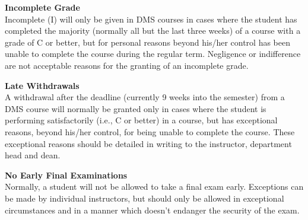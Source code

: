 \documentclass[12pt]{article}
\renewcommand{\emph}[1]{\textsf{\textbf{#1}}}
\newcommand{\localhead}[1]{\par\smallskip\textbf{#1}\nobreak\\}%
\def\subheading#1{\localhead{\emph{#1}}}
\begin{document}



\subheading{Incomplete Grade} 
Incomplete (I) will only be given in
  DMS courses in cases where
  the student has completed the majority (normally all but the last
  three weeks) of a course with a grade of C or better, but for
  personal reasons beyond his/her control has been unable to complete
  the course during the regular term. Negligence or indifference are
  not acceptable reasons for the granting of an incomplete
  grade. 

\subheading{Late Withdrawals} 
A withdrawal after the deadline
  (currently 9 weeks into the semester) from a DMS course will
  normally be granted only in cases where the student is performing
  satisfactorily (i.e., C or better) in a course, but has exceptional
  reasons, beyond his/her control, for being unable to complete the
  course. These exceptional reasons should be detailed in writing to
  the instructor, department head and dean.

\subheading{No Early Final Examinations}
 Normally, a student will not be
  allowed to take a final exam early. Exceptions can be made by
  individual instructors, but should only be allowed in exceptional
  circumstances and in a manner which doesn't endanger the security of
  the exam.

\pagebreak

 
\end{document}
